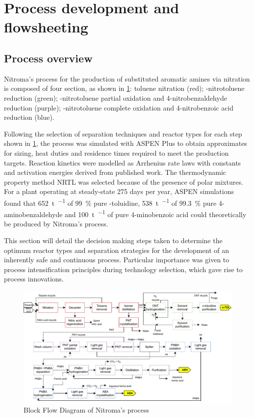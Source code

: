 \section{Process development and flowsheeting}
\label{sec:flowsheeting}

\subsection{Process overview}

Nitroma's process for the production of substituted aromatic amines via nitration is composed of four section, as shown in \cref{fig:BFD}: toluene nitration (red); \ortho-nitrotoluene reduction (green); \para-nitrotoluene partial oxidation and 4-nitrobenzaldehyde reduction (purple); \para-nitrotoluene complete oxidation and 4-nitrobenzoic acid reduction (blue). 


Following the selection of separation techniques and reactor types for each step shown in \cref{fig:BFD}, the process was simulated with ASPEN Plus to obtain approximates for sizing, heat duties and residence times required to meet the production targets. Reaction kinetics were modelled as Arrhenius rate laws with constants and activation energies derived from published work. The thermodynamic property method NRTL was selected because of the presence of polar mixtures. For a plant operating at steady-state 275 days per year, ASPEN simulations found that \SI{652}{\tonne\per\year} of \SI{99}{\percent} pure \ortho-toluidine, \SI{538}{\tonne\per\year} of \SI{99.3}{\percent} pure 4-aminobenzaldehyde and \SI{100}{\tonne\per\year} of pure 4-minobenzoic acid could theoretically be produced by Nitroma's process.


This section will detail the decision making steps taken to determine the optimum reactor types and separation strategies for the development of an inherently safe and continuous process. Particular importance was given to process intensification principles during technology selection, which gave rise to process innovations.

\begin{figure}[htb]
    \centering
    \includegraphics[width=\linewidth]{chapters/1-synthesis/1-Figures/BFD_nitroma-07_03.pdf}
    \caption{Block Flow Diagram of Nitroma's process}
    \label{fig:BFD}
\end{figure}


